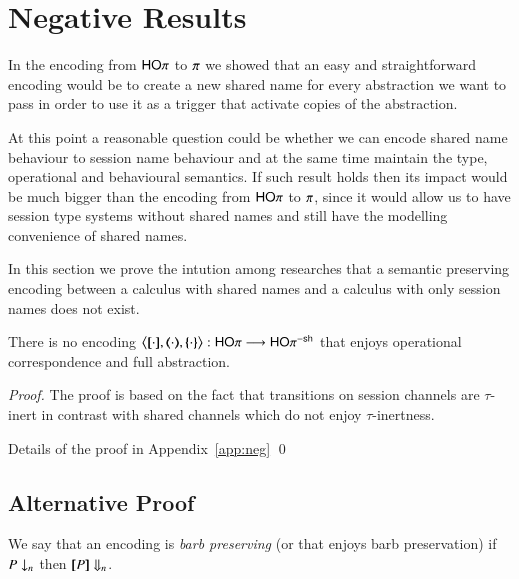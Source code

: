 \section{Negative Results}

In the encoding from $\mathsf{HO}\pi$ to $\pi$ we showed that
an easy and straightforward encoding would be to create
a new shared name for every abstraction we want to pass
in order to use it as a trigger that activate copies of
the abstraction.

At this point a reasonable question could be whether we can
encode shared name behaviour to session name behaviour and at
the same time maintain the type, operational and behavioural semantics.
If such result holds then its impact would be much bigger than
the encoding from $\mathsf{HO}\pi$ to $\pi$, since it would
allow us to have session type systems without shared names
and still have the modelling convenience of shared names.

In this section we prove the intution among researches 
that a semantic preserving encoding between a calculus
with shared names and a calculus with only session names
does not exist.

\begin{theorem}\rm
	There is no encoding $\enco{\map{\cdot}, \mapt{\cdot}, \mapa{\cdot}}: \HOp \longrightarrow \HOp^{\minussh}$
	that enjoys operational correspondence and full abstraction.
\end{theorem}

\begin{proof}
	The proof is based on the fact that
	transitions on session channels are
	$\tau$-inert in contrast with shared
	channels which do not enjoy
	$\tau$-inertness.

	Details of the proof in Appendix~\ref{app:neg}
	\qed
\end{proof}

\subsection{Alternative Proof}

We say that an encoding is \emph{barb preserving} (or that enjoys barb preservation)
if 
$P \downarrow_{n}$
then 
$[\!\![P]\!\!] \Downarrow_{n}$.

%
%

